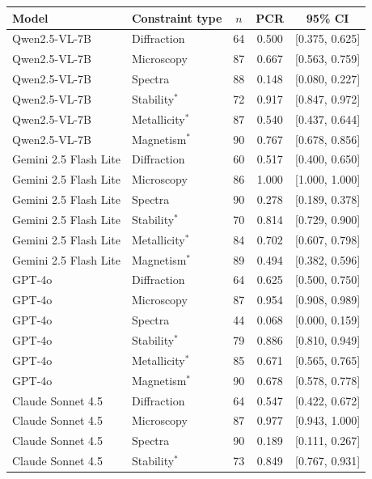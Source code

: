 \documentclass[11pt,a4paper]{article}
\begin{document}
\begin{table}[htbp]
\centering
{\scriptsize\setlength{\tabcolsep}{4pt}\renewcommand{\arraystretch}{1.05}
\begin{tabular}{l l S[table-format=3.0] S[table-format=1.3] c}
\toprule
Model & Constraint type & {$n$} & {PCR} & {95\% CI} \\
\midrule
Qwen2.5-VL-7B & Diffraction & 64 & 0.500 & [0.375, 0.625] \\
Qwen2.5-VL-7B & Microscopy & 87 & 0.667 & [0.563, 0.759] \\
Qwen2.5-VL-7B & Spectra & 88 & 0.148 & [0.080, 0.227] \\
Qwen2.5-VL-7B & Stability$^{*}$ & 72 & 0.917 & [0.847, 0.972] \\
Qwen2.5-VL-7B & Metallicity$^{*}$ & 87 & 0.540 & [0.437, 0.644] \\
Qwen2.5-VL-7B & Magnetism$^{*}$ & 90 & 0.767 & [0.678, 0.856] \\
\addlinespace
Gemini 2.5 Flash Lite & Diffraction & 60 & 0.517 & [0.400, 0.650] \\
Gemini 2.5 Flash Lite & Microscopy & 86 & 1.000 & [1.000, 1.000] \\
Gemini 2.5 Flash Lite & Spectra & 90 & 0.278 & [0.189, 0.378] \\
Gemini 2.5 Flash Lite & Stability$^{*}$ & 70 & 0.814 & [0.729, 0.900] \\
Gemini 2.5 Flash Lite & Metallicity$^{*}$ & 84 & 0.702 & [0.607, 0.798] \\
Gemini 2.5 Flash Lite & Magnetism$^{*}$ & 89 & 0.494 & [0.382, 0.596] \\
\addlinespace
GPT-4o & Diffraction & 64 & 0.625 & [0.500, 0.750] \\
GPT-4o & Microscopy & 87 & 0.954 & [0.908, 0.989] \\
GPT-4o & Spectra & 44 & 0.068 & [0.000, 0.159] \\
GPT-4o & Stability$^{*}$ & 79 & 0.886 & [0.810, 0.949] \\
GPT-4o & Metallicity$^{*}$ & 85 & 0.671 & [0.565, 0.765] \\
GPT-4o & Magnetism$^{*}$ & 90 & 0.678 & [0.578, 0.778] \\
\addlinespace
Claude Sonnet 4.5 & Diffraction & 64 & 0.547 & [0.422, 0.672] \\
Claude Sonnet 4.5 & Microscopy & 87 & 0.977 & [0.943, 1.000] \\
Claude Sonnet 4.5 & Spectra & 90 & 0.189 & [0.111, 0.267] \\
Claude Sonnet 4.5 & Stability$^{*}$ & 73 & 0.849 & [0.767, 0.931] \\

\end{tabular}}
\end{table}
\end{document}
